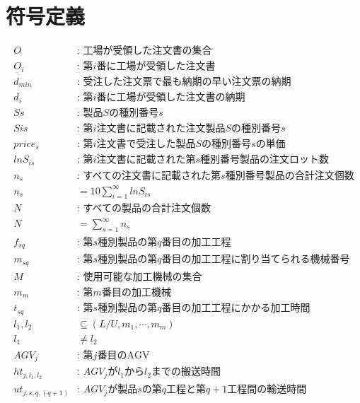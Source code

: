\documentclass{jarticle}
\begin{document}
\section{符号定義}
\begin{align}
    O &\text{: 工場が受領した注文書の集合} \nonumber\\
    O_{i} &\text{: 第$i$番に工場が受領した注文書} \nonumber\\
    d_{min} &\text{: 受注した注文票で最も納期の早い注文票の納期} \nonumber\\
    d_{i} &\text{: 第$i$番に工場が受領した注文書の納期} \nonumber\\
    S{s} &\text{: 製品$S$の種別番号$s$} \nonumber\\
    S{is} &\text{: 第$i$注文書に記載された注文製品$S$の種別番号$s$} \nonumber\\
    price_{s} &\text{: 第$i$注文書で受注した製品$S$の種別番号$s$の単価} \nonumber\\
    lnS_{is} &\text{: 第$i$注文書に記載された第$s$種別番号製品の注文ロット数} \nonumber\\
    n_{s} &\text{: すべての注文書に記載された第$s$種別番号製品の合計注文個数} \nonumber\\
    n_{s} &= 10\sum_{i=1}^{\infty} lnS_{is} \nonumber\\
    N &\text{: すべての製品の合計注文個数} \nonumber\\
    N &= \sum_{s=1}^{\infty} n_{s} \nonumber\\
    f_{sq} &\text{: 第$s$種別製品の第$q$番目の加工工程} \nonumber\\
    m_{sq} &\text{: 第$s$種別製品の第$q$番目の加工工程に割り当てられる機械番号} \nonumber\\
    M &\text{: 使用可能な加工機械の集合} \nonumber\\
    m_{m} &\text{: 第$m$番目の加工機械} \nonumber\\
    t_{sq} &\text{: 第$s$種別製品の第$q$番目の加工工程にかかる加工時間} \nonumber\\
    l_{1},l_{2} &\subseteq (L/U,m_{1},\cdots,m_{m})  \nonumber\\
    l_{1}& \ne l_{2} \nonumber\\
    AGV_{j} & \text{: 第$j$番目のAGV} \nonumber\\
    ht_{j,l_{1},l_{2}} &\text{: $AGV_{j}$が$l_{1}$から$l_{2}$までの搬送時間} \nonumber\\
    ut_{j,s,q,(q+1)} &\text{: $AGV_{j}$が製品$s$の第$q$工程と第$q+1$工程間の輸送時間} \nonumber
\end{align}
\end{document}
